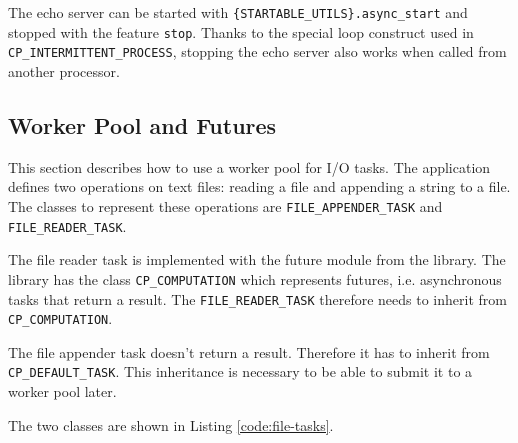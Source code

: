 The echo server can be started with \lstinline!{STARTABLE_UTILS}.async_start! and stopped with the feature \lstinline!stop!.
Thanks to the special loop construct used in \lstinline!CP_INTERMITTENT_PROCESS!, stopping the echo server also works when called from another processor.

\subsection{Worker Pool and Futures}

This section describes how to use a worker pool for I/O tasks.
The application defines two operations on text files: reading a file and appending a string to a file.
The classes to represent these operations are \lstinline!FILE_APPENDER_TASK! and \lstinline!FILE_READER_TASK!.

The file reader task is implemented with the future module from the library.
The library has the class \lstinline!CP_COMPUTATION! which represents futures, i.e. asynchronous tasks that return a result.
The \lstinline!FILE_READER_TASK! therefore needs to inherit from \lstinline!CP_COMPUTATION!.

The file appender task doesn't return a result.
Therefore it has to inherit from \lstinline!CP_DEFAULT_TASK!.
This inheritance is necessary to be able to submit it to a worker pool later.

The two classes are shown in Listing \ref{code:file-tasks}.

